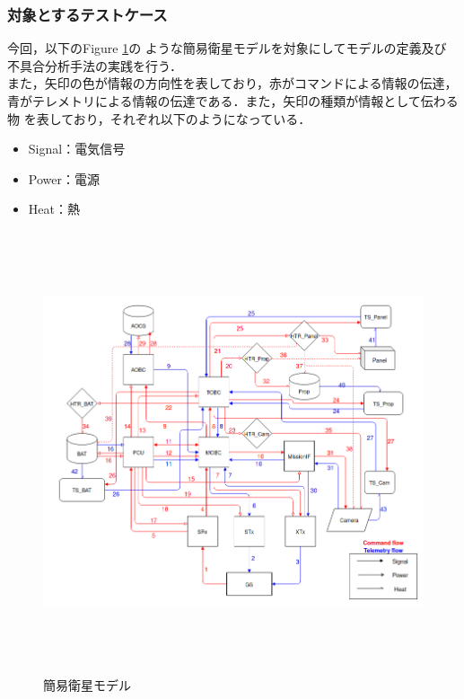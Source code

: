\documentclass[11pt]{article}
\begin{document}
\subsubsection{対象とするテストケース}
今回，以下のFigure \ref{fig:simple_sat}の
ような簡易衛星モデルを対象にしてモデルの定義及び
不具合分析手法の実践を行う．\\
また，矢印の色が情報の方向性を表しており，赤がコマンドによる情報の伝達，
青がテレメトリによる情報の伝達である．また，矢印の種類が情報として伝わる物
を表しており，それぞれ以下のようになっている．
\begin{itemize}
   \item Signal：電気信号
   \item Power：電源
   \item Heat：熱
\end{itemize}
\begin{figure}[H]
   \centering
      \includegraphics[height=13.0cm]{figure/satellite_diagram.PNG}
      \caption{簡易衛星モデル}
      \label{fig:simple_sat}
\end{figure}
\end{document}
